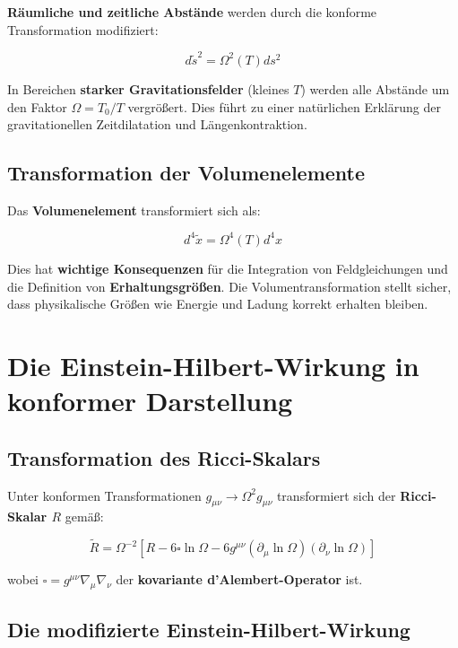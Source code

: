 \documentclass[12pt,a4paper]{report}
\begin{document}
\textbf{Räumliche und zeitliche Abstände} werden durch die konforme Transformation modifiziert:

\begin{equation}
	d\tilde{s}^2 = \Omega^2(T) ds^2
\end{equation}

In Bereichen \textbf{starker Gravitationsfelder} (kleines $T$) werden alle Abstände um den Faktor $\Omega = T_0/T$ vergrößert. Dies führt zu einer natürlichen Erklärung der gravitationellen Zeitdilatation und Längenkontraktion.

\subsection{Transformation der Volumenelemente}

Das \textbf{Volumenelement} transformiert sich als:

\begin{equation}
	d^4\tilde{x} = \Omega^4(T) d^4x
\end{equation}

Dies hat \textbf{wichtige Konsequenzen} für die Integration von Feldgleichungen und die Definition von \textbf{Erhaltungsgrößen}. Die Volumentransformation stellt sicher, dass physikalische Größen wie Energie und Ladung korrekt erhalten bleiben.

\section{Die Einstein-Hilbert-Wirkung in konformer Darstellung}

\subsection{Transformation des Ricci-Skalars}

Unter konformen Transformationen $g_{\mu\nu} \to \Omega^2 g_{\mu\nu}$ transformiert sich der \textbf{Ricci-Skalar $R$} gemäß:

\begin{equation}
	\tilde{R} = \Omega^{-2}[R - 6\square\ln \Omega - 6g^{\mu\nu}(\partial_\mu \ln \Omega)(\partial_\nu \ln \Omega)]
\end{equation}

wobei $\square = g^{\mu\nu}\nabla_\mu\nabla_\nu$ der \textbf{kovariante d'Alembert-Operator} ist.

\subsection{Die modifizierte Einstein-Hilbert-Wirkung}
\end{document}
